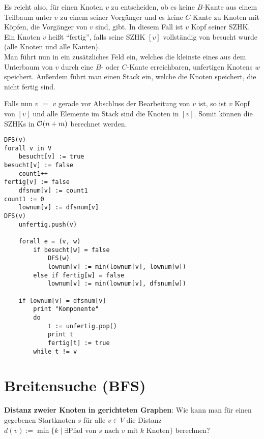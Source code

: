 \linie

Es reicht also, für einen Knoten $v$ zu entscheiden, ob es keine $B$-Kante
aus einem Teilbaum unter $v$ zu einem seiner Vorgänger und es keine $C$-Kante
zu Knoten mit Köpfen, die Vorgänger von $v$ sind, gibt.
In diesem Fall ist $v$ Kopf seiner SZHK. \\
Ein Knoten $v$ heißt "`fertig"', falls seine SZHK $[v]$ vollständig von
 besucht wurde (alle Knoten und alle Kanten). \\
Man führt nun in  ein zusätzliches Feld  ein, welches
die kleinste  eines aus dem Unterbaum von $v$ durch eine
$B$- oder $C$-Kante erreichbaren, unfertigen Knotens $w$ speichert.
Außerdem führt man einen Stack  ein, welche die Knoten
speichert, die nicht fertig sind.

Falls nun \code{dfsnum[}$v$\code{]} $=$ \code{lownum[}$v$\code{]} gerade
vor Abschluss der Bearbeitung von $v$\code{)} ist,
so ist $v$ Kopf von $[v]$ und alle Elemente im Stack  sind
die Knoten in $[v]$.
Somit können die SZHKs in $\mathcal{O}(n + m)$ berechnet werden.

\begin{lstlisting}
DFS(v)                                                            forall v in V
    besucht[v] := true                                                besucht[v] := false
    count1++                                                          fertig[v] := false
    dfsnum[v] := count1                                               count1 := 0
    lownum[v] := dfsnum[v]                                            DFS(v)
    unfertig.push(v)

    forall e = (v, w)
        if besucht[w] = false
            DFS(w)
            lownum[v] := min(lownum[v], lownum[w])
        else if fertig[w] = false
            lownum[v] := min(lownum[v], dfsnum[w])

    if lownum[v] = dfsnum[v]
        print "Komponente"
        do
            t := unfertig.pop()
            print t
            fertig[t] := true
        while t != v
\end{lstlisting}

\section{%
    Breitensuche (BFS)%
}

\textbf{Distanz zweier Knoten in gerichteten Graphen}:
Wie kann man für einen gegebenen Startknoten $s$ für alle $v \in V$ die
Distanz $d(v) := \min\{k \;|\; \exists\text{Pfad von } s \text{ nach } v
\text{ mit } k \text{ Knoten}\}$ berechnen?

